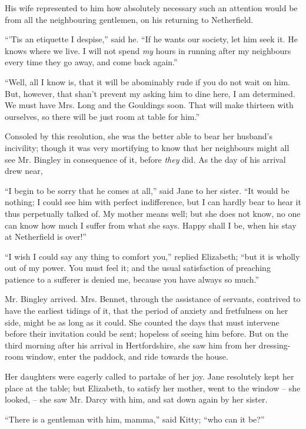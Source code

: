 His wife represented to him how absolutely necessary
such an attention would be from all the neighbouring
gentlemen, on his returning to Netherfield.

“’Tis an etiquette I despise,” said he. “If he wants
our society, let him seek it. He knows where we live.
I will not spend \textit{my} hours in running after my neighbours
every time they go away, and come back again.”

“Well, all I know is, that it will be abominably rude
if you do not wait on him. But, however, that shan’t
prevent my asking him to dine here, I am determined.
We must have Mrs. Long and the Gouldings soon. That
will make thirteen with ourselves, so there will be just
room at table for him.”

Consoled by this resolution, she was the better able to
bear her husband’s incivility; though it was very mortifying
to know that her neighbours might all see Mr. Bingley
in consequence of it, before \textit{they} did. As the day of his
arrival drew near,

“I begin to be sorry that he comes at all,” said Jane
to her sister. “It would be nothing; I could see him
with perfect indifference, but I can hardly bear to hear
it thus perpetually talked of. My mother means well;
but she does not know, no one can know how much
I suffer from what she says. Happy shall I be, when his
stay at Netherfield is over!”

“I wish I could say any thing to comfort you,” replied
Elizabeth; “but it is wholly out of my power. You
must feel it; and the usual satisfaction of preaching
patience to a sufferer is denied me, because you have
always so much.”

Mr. Bingley arrived. Mrs. Bennet, through the assistance
of servants, contrived to have the earliest tidings
of it, that the period of anxiety and fretfulness on her
side, might be as long as it could. She counted the days
that must intervene before their invitation could be sent;
hopeless of seeing him before. But on the third morning
after his arrival in Hertfordshire, she saw him from her
dressing-room window, enter the paddock, and ride towards
the house.

Her daughters were eagerly called to partake of her joy.
Jane resolutely kept her place at the table; but Elizabeth,
to satisfy her mother, went to the window -- she looked, -- she
saw Mr. Darcy with him, and sat down again by her
sister.

“There is a gentleman with him, mamma,” said Kitty;
“who can it be?”

